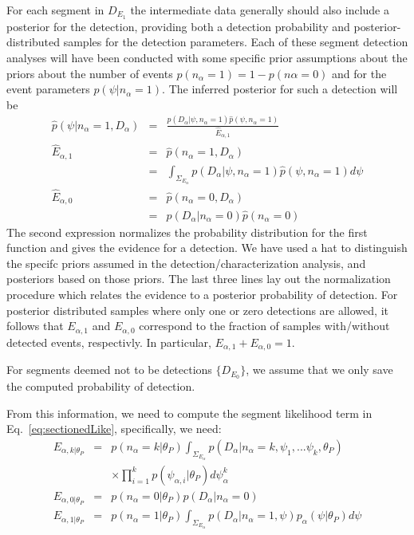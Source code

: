 \documentclass[twocolumn,showpacs,aps,prd,nobibnotes,nofootinbib,floatfix]{revtex4-1}
\begin{document}
For each segment in  $D_{E_1}$ the intermediate data generally should also include a posterior for the detection, providing both a detection probability and posterior-distributed samples for the detection parameters.  Each of these segment detection analyses will have been conducted with some specific prior assumptions about the priors about the number of events $p(n_\alpha=1)=1-p(n\alpha=0)$ and for the event parameters  $p(\psi|n_\alpha=1)$.  The inferred posterior for such a detection will be
\begin{eqnarray*}
  \hat p(\psi|n_\alpha{=}1,D_\alpha)&=&\frac{p(D_\alpha|\psi,n_\alpha{=}1) \hat p(\psi,n_\alpha{=}1)}{\hat E_{\alpha,1}}\\
  \hat E_{\alpha,1}&=&\hat p(n_\alpha{=}1,D_\alpha)\\
  &=&\int_{\Sigma_{E_\alpha}}{p(D_\alpha|\psi,n_\alpha{=}1) \hat p(\psi,n_\alpha{=}1)}d\psi\\
  \hat E_{\alpha,0}&=&\hat p(n_\alpha{=}0,D_\alpha)\\
  &=& {p(D_\alpha|n_\alpha{=}0)\hat p(n_\alpha{=}0)}
  \label{eq:Phats}
\end{eqnarray*}
The second expression normalizes the probability distribution for the first function and gives the evidence for a detection. We have used a hat to distinguish the specifc priors assumed in the detection/characterization analysis, and posteriors based on those priors. The last three lines lay out the normalization procedure which relates the evidence to a posterior probability of detection.
For posterior distributed samples where only one or zero detections are allowed, it follows that $E_{\alpha,1}$ and $E_{\alpha,0}$ correspond to the fraction of samples with/without detected events, respectivly. In particular, $E_{\alpha,1}+E_{\alpha,0}=1$.

For segments deemed not to be detections $\{D_{E_0}\}$, we assume that we only save the computed probability of detection.

From this information, we need to compute the segment likelihood term in Eq.~\ref{eq:sectionedLike}, specifically, we need:
\begin{eqnarray*}
  E_{\alpha,k|\theta_P}&=&
  p(n_\alpha{=}k|\theta_P)\int_{\Sigma_{E_\alpha}} p(D_\alpha|n_\alpha{=}k,{\psi_1,...\psi_k},\theta_P)\nonumber\\
  &&\times \prod_{i{=}1}^k p(\psi_{\alpha,i}|\theta_P)d\psi_{\alpha}^k\\
  E_{\alpha,0|\theta_P}&=&
  p(n_\alpha{=}0|\theta_P)p(D_\alpha|n_\alpha{=}0)\\
  E_{\alpha,1|\theta_P}&=&
  p(n_\alpha{=}1|\theta_P)\int_{\Sigma_{E_\alpha}} p(D_\alpha|n_\alpha{=}1,{\psi}) p_\alpha(\psi|\theta_P)d\psi
\end{eqnarray*}
\end{document}
